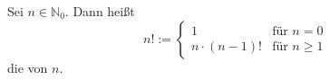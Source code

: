 Sei $n \in \mathbb{N}_0$. Dann heißt 
$$
n! := \begin{cases}
1 & \text{für $n=0$} \\
n \cdot (n-1)! & \text{für $n \geq 1$}
\end{cases}
$$
die  von $n$.